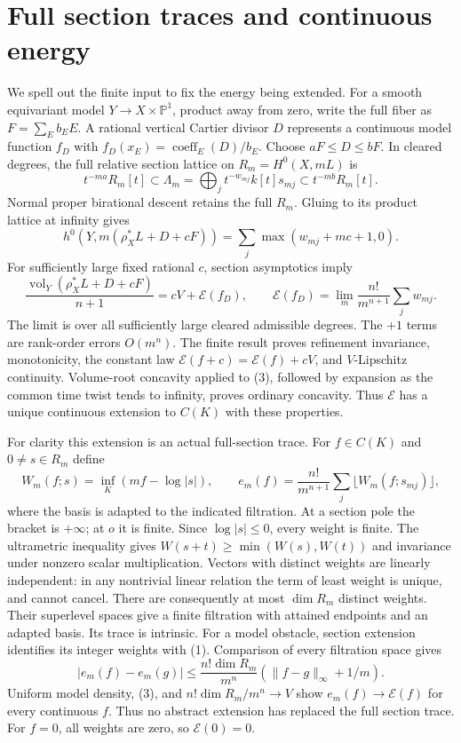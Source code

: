 \documentclass[11pt]{article}
\newcommand{\vol}{\operatorname{vol}}
\begin{document}
\section{Full section traces and continuous energy}
We spell out the finite input to fix the energy being extended.
For a smooth equivariant model $Y\to X\times\mathbb P^1$,
product away from zero, write the full fiber as $F=\sum_E b_EE$.
A rational vertical Cartier divisor $D$ represents a continuous
model function $f_D$ with $f_D(x_E)=\operatorname{coeff}_E(D)/b_E$.
Choose $aF\leq D\leq bF$. In cleared degrees, the full relative
section lattice on $R_m=H^0(X,mL)$ is
\[
 t^{-ma}R_m[t]\subset\Lambda_m
 =\bigoplus_jt^{-w_{mj}}k[t]s_{mj}\subset t^{-mb}R_m[t].
                                                        \tag{1}
\]
Normal proper birational descent retains the full $R_m$.
Gluing to its product lattice at infinity gives
\[
 h^0(Y,m(\rho_X^*L+D+cF))
       =\sum_j\max(w_{mj}+mc+1,0).
                                                        \tag{2}
\]
For sufficiently large fixed rational $c$, section asymptotics imply
\[
 \frac{\vol_Y(\rho_X^*L+D+cF)}{n+1}
       =cV+\mathscr E(f_D),\qquad
 \mathscr E(f_D)=\lim_m\frac{n!}{m^{n+1}}\sum_j w_{mj}.
                                                        \tag{3}
\]
The limit is over all sufficiently large cleared admissible degrees.
The $+1$ terms are rank-order errors $O(m^n)$.
The finite result proves refinement invariance, monotonicity,
the constant law $\mathscr E(f+c)=\mathscr E(f)+cV$, and
$V$-Lipschitz continuity. Volume-root concavity applied to (3),
followed by expansion as the common time twist tends to infinity,
proves ordinary concavity. Thus $\mathscr E$ has a unique continuous
extension to $C(K)$ with these properties.

For clarity this extension is an actual full-section trace.
For $f\in C(K)$ and $0\ne s\in R_m$ define
\[
 W_m(f;s)=\inf_K(mf-\log|s|),\qquad
 e_m(f)=\frac{n!}{m^{n+1}}
                \sum_j\lfloor W_m(f;s_{mj})\rfloor,       \tag{4}
\]
where the basis is adapted to the indicated filtration.
At a section pole the bracket is $+\infty$; at $o$ it is finite.
Since $\log|s|\leq0$, every weight is finite.
The ultrametric inequality gives
$W(s+t)\geq\min(W(s),W(t))$ and invariance under nonzero scalar
multiplication. Vectors with distinct weights are linearly independent:
in any nontrivial linear relation the term of least weight is unique,
and cannot cancel. There are consequently at most $\dim R_m$
distinct weights. Their superlevel spaces give a finite filtration
with attained endpoints and an adapted basis. Its trace is intrinsic.
For a model obstacle, section extension identifies its integer
weights with (1). Comparison of every filtration space gives
\[
 |e_m(f)-e_m(g)|
 \leq\frac{n!\dim R_m}{m^n}
                   (\|f-g\|_\infty+1/m).               \tag{5}
\]
Uniform model density, (3), and
$n!\dim R_m/m^n\to V$ show $e_m(f)\to\mathscr E(f)$ for every
continuous $f$. Thus no abstract extension has replaced the full
section trace. For $f=0$, all weights are zero, so $\mathscr E(0)=0$.
\end{document}
